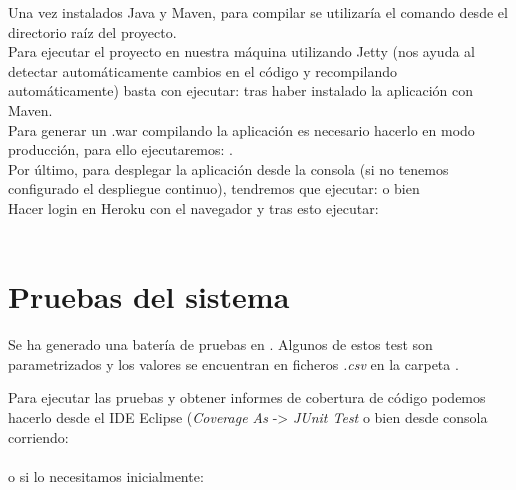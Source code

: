 Una vez instalados Java y Maven, para compilar se utilizaría el comando  desde el directorio raíz del proyecto.\\

Para ejecutar el proyecto en nuestra máquina utilizando Jetty (nos ayuda al detectar automáticamente cambios en el código y recompilando automáticamente) basta con ejecutar:  tras haber instalado la aplicación con Maven.\\

Para generar un .war compilando la aplicación es necesario hacerlo en modo producción, para ello ejecutaremos: .\\

Por último, para desplegar la aplicación desde la consola (si no tenemos configurado el despliegue continuo), tendremos que ejecutar:
 o bien \\
Hacer login en Heroku con el navegador y tras esto ejecutar:\\
\\

\section{Pruebas del sistema}
Se ha generado una batería de pruebas en . Algunos de estos test son parametrizados y los valores se encuentran en ficheros \textit{.csv} en la carpeta .

Para ejecutar las pruebas y obtener informes de cobertura de código podemos hacerlo desde el IDE Eclipse (\textit{Coverage As} -> \textit{JUnit Test} o bien desde consola corriendo:\\
\\
o si lo necesitamos inicialmente:\\
